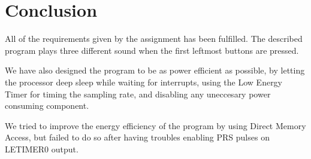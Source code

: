 \section{Conclusion}
All of the requirements given by the assignment has been fulfilled. The described program plays three different sound when the first leftmost buttons are pressed. 

We have also designed the program to be as power efficient as possible, by letting the processor deep sleep while waiting for interrupts, using the Low Energy Timer for timing the sampling rate, and disabling any uneccesary power consuming component. 

We tried to improve the energy efficiency of the program by using Direct Memory Access, but failed to do so after having troubles enabling PRS pulses on LETIMER0 output.  